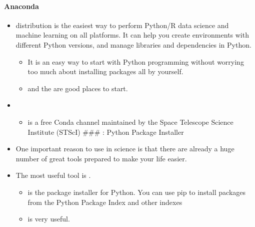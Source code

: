 \documentclass[letterpaper,10pt,english]{sphinxmanual}
\begin{document}
\paragraph{Anaconda}
\label{\detokenize{resource/programing/python_basic:anaconda}}\begin{itemize}
\item {} 
 distribution is the easiest way to perform Python/R data
science and machine learning on all platforms. It can help you create
environments with different Python versions, and manage libraries and
dependencies in Python.
\begin{itemize}
\item {} 
It is an easy way to start with Python programming without
worrying too much about installing packages all by yourself.

\item {} 
and the 
are good places to start.

\end{itemize}

\item {} 
\begin{itemize}
\item {} 
 is a free Conda channel maintained by the Space
Telescope Science Institute (STScI) \#\#\# : Python Package
Installer

\end{itemize}

\item {} 
One important reason to use  in science is that there are
already a huge number of great tools prepared to make your life
easier.

\item {} 
The most useful tool is .
\begin{itemize}
\item {} 
 is the package installer for Python. You can use pip to
install packages from the Python Package Index and other indexes

\item {} 
 is very
useful.


\end{itemize}
\end{itemize}
\end{document}
